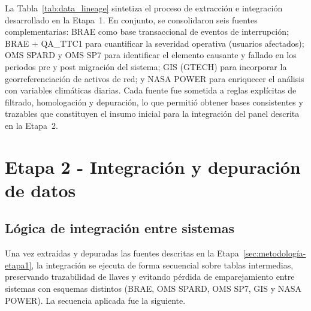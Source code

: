     La Tabla~\ref{tab:data_lineage} sintetiza el proceso de extracción e integración desarrollado en la Etapa~1. En conjunto, se consolidaron seis fuentes complementarias: BRAE como base transaccional de eventos de interrupción; BRAE + QA\_TTC1 para cuantificar la severidad operativa (usuarios afectados); OMS SPARD y OMS SP7 para identificar el elemento causante y fallado en los periodos pre y post migración del sistema; GIS (GTECH) para incorporar la georreferenciación de activos de red; y NASA POWER para enriquecer el análisis con variables climáticas diarias. Cada fuente fue sometida a reglas explícitas de filtrado, homologación y depuración, lo que permitió obtener bases consistentes y trazables que constituyen el insumo inicial para la integración del panel descrita en la Etapa~2.



\section{Etapa 2 - Integración y depuración de datos}
\label{sec:metodología-etapa2}

\subsection{Lógica de integración entre sistemas}
\label{sec:logica_integracion}
    Una vez extraídas y depuradas las fuentes descritas en la Etapa~\ref{sec:metodología-etapa1}, la integración se ejecuta de forma secuencial sobre tablas intermedias, preservando trazabilidad de llaves y evitando pérdida de emparejamiento entre sistemas con esquemas distintos (BRAE, OMS SPARD, OMS SP7, GIS y NASA POWER). La secuencia aplicada fue la siguiente.

